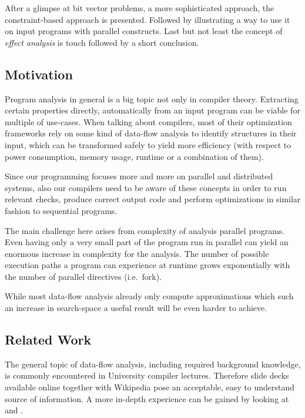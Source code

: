 \documentclass[article]{uibk}
\begin{document}
After a glimpse at bit vector problems, a more sophisticated approach, the
constraint-based approach is presented. Followed by illustrating a way to use
it on input programs with parallel constructs. Last but not least the concept
of \textit{effect analysis} is touch followed by a short conclusion.

\subsection{Motivation}

Program analysis in general is a big topic not only in compiler theory.
Extracting certain properties directly, automatically from an input program can
be viable for multiple of use-cases. When talking about compilers, most of
their optimization frameworks rely on some kind of data-flow analysis to
identify structures in their input, which can be transformed safely to yield
more efficiency (with respect to power consumption, memory usage, runtime
or a combination of them).

Since our programming focuses more and more on parallel and distributed
systems, also our compilers need to be aware of these concepts in order to run
relevant checks, produce correct output code and perform optimizations in
similar fashion to sequential programs.

The main challenge here arises from complexity of analysis parallel programs.
Even having only a very small part of the program run in parallel can yield an
enormous increase in complexity for the analysis. The number of possible
execution paths a program can experience at runtime grows exponentially with
the number of parallel directives (i.e.\ fork).

While most data-flow analysis already only compute approximations which such an
increase in search-space a useful result will be even harder to achieve.

\subsection{Related Work}

The general topic of data-flow analysis, including required background
knowledge, is commonly encountered in University compiler lectures. Therefore
slide decks available online together with Wikipedia pose an acceptable, easy
to understand source of information. A more in-depth experience can be gained
by looking at \cite{herbert_phd} and \cite{Nielson:ppa}.
\end{document}
